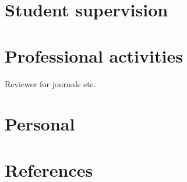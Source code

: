 \documentclass[12pt]{moderncv}
\begin{document}
\section{Student supervision}

\section{Professional activities}

Reviewer for journals etc.

\section{Personal}

\vspace{10cm}

\section{References}
\end{document}
